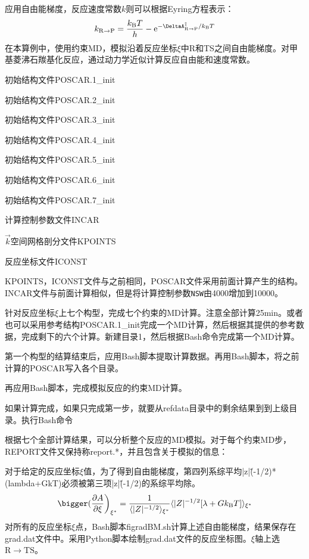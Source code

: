 应用自由能梯度，反应速度常数$k$则可以根据\textrm{Eyring}方程表示：
\begin{displaymath}
	k_{\mathrm{R}\rightarrow\mathrm{P}}=\dfrac{k_{\mathrm{B}}T}h-\mathrm{e}^{-\DeltaA_{\mathrm{R}\rightarrow\mathrm{P}}^{\ddagger}/k_{\mathrm{B}}T}
\end{displaymath}
在本算例中，使用约束\textrm{MD}，模拟沿着反应坐标$\xi$中\textrm{R}和\textrm{TS}之间自由能梯度。对甲基菱沸石羰基化反应，通过动力学近似计算反应自由能和速度常数。

初始结构文件\textrm{POSCAR.1\_init}

初始结构文件\textrm{POSCAR.2\_init}

初始结构文件\textrm{POSCAR.3\_init}

初始结构文件\textrm{POSCAR.4\_init}

初始结构文件\textrm{POSCAR.5\_init}

初始结构文件\textrm{POSCAR.6\_init}

初始结构文件\textrm{POSCAR.7\_init}

计算控制参数文件\textrm{INCAR}

$\vec k$空间网格剖分文件\textrm{KPOINTS}

反应坐标文件\textrm{ICONST}

\textrm{KPOINTS}，\textrm{ICONST}文件与之前相同，\textrm{POSCAR}文件采用前面计算产生的结构。\textrm{INCAR}文件与前面计算相似，但是将计算控制参数\texttt{NSW}由4000增加到10000。

针对反应坐标$\xi$上七个构型，完成七个约束的\textrm{MD}计算。注意全部计算\textrm{25min}。或者也可以采用参考结构\textrm{POSCAR.1\_init}完成一个\textrm{MD}计算，然后根据其提供的参考数据，完成剩下的六个计算。新建目录\textrm{1}，然后根据\textrm{Bash}命令完成第一个\textrm{MD}计算。

第一个构型的结算结束后，应用\textrm{Bash}脚本提取计算数据。再用\textrm{Bash}脚本，将之前计算的\textrm{POSCAR}写入各个目录。

再应用\textrm{Bash}脚本，完成模拟反应的约束\textrm{MD}计算。

如果计算完成，如果只完成第一步，就要从\textrm{refdata}目录中的剩余结果到到上级目录。执行\textrm{Bash}命令

根据七个全部计算结果，可以分析整个反应的\textrm{MD}模拟。对于每个约束\textrm{MD}步，\textrm{REPORT}文件又保持称\textrm{report.*}，并且包含关于模拟的信息：

对于给定的反应坐标$\xi$值，为了得到自由能梯度，第四列系综平均\textrm{|z|\^(-1/2)*(lambda+GkT)}必须被第三项\textrm{|z|\^(-1/2)}的系综平均除。%
\begin{displaymath}
	\bigger(\dfrac{\partial A}{\partial\xi}\bigg)_{\xi^{\ast}}=\dfrac1{\langle|Z|^{-1/2}\rangle_{\xi^{\ast}}}\langle|Z|^{-1/2}[\lambda+Gk_{\mathrm{B}}T]\rangle_{\xi^{\ast}}
\end{displaymath}
对所有的反应坐标$\xi$点，\textrm{Bash}脚本\textrm{figradBM.sh}计算上述自由能梯度，结果保存在\textrm{grad.dat}文件中。采用\textrm{Python}脚本绘制\textrm{grad.dat}文件的反应坐标图。$\xi$轴上选$\mathrm{R}\rightarrow\mathrm{TS}$。

